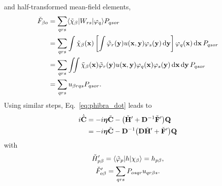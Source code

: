 \documentclass[aip,jcp,preprint,superscriptaddress,nofootinbib]{revtex4-1}
\begin{document}
and half-transformed mean-field elements,
\begin{align}
    \check{F}_{\beta o}
    &= \sum_{qrs}  \langle \tilde{\chi}_{\beta} \vert W_{rs} \vert \varphi_{q} \rangle P_{qsor} \nonumber\\
    &= \sum_{qrs}
    \int \tilde{\chi}_{\beta} (\mathbf{x}) \left[ 
    \int \tilde{\varphi}_{r}(\mathbf{y}) u(\mathbf{x}, \mathbf{y}) \varphi_{s}(\mathbf{y})  \dd{\mathbf{y}} 
    \right] \varphi_{q} (\mathbf{x}) \dd{\mathbf{x}}
    P_{qsor} \nonumber\\
    &= \sum_{qrs}
    \iint \tilde{\chi}_{\beta} (\mathbf{x}) \tilde{\varphi}_{r}(\mathbf{y}) u(\mathbf{x}, \mathbf{y}) \varphi_{q} (\mathbf{x}) \varphi_{s}(\mathbf{y}) \dd{\mathbf{x}} \dd{\mathbf{y}} 
    P_{qsor} \nonumber\\
    &= \sum_{qrs}  u_{\beta r q s} P_{qsor}.
\end{align}
Using similar steps, Eq.~\eqref{eq:phibra_dot} leads to
\begin{align} \label{eq:C_tilde_dot}
    i \dot{\tilde{\mathbf{C}}} 
    &= -i  \bm{\eta} \tilde{\mathbf{C}} - 
    \big( \check{\mathbf{H}}' + \mathbf{D}^{-1} \check{\mathbf{F}}' \big) \mathbf{Q} \nonumber\\
    &= -i  \bm{\eta} \tilde{\mathbf{C}} - 
    \mathbf{D}^{-1} \big( \mathbf{D} \check{\mathbf{H}}' + \check{\mathbf{F}}' \big) \mathbf{Q}
\end{align}
with
\begin{gather}
    \check{H}'_{p \beta} = \langle \tilde{\varphi}_{p} \vert h \vert \chi_{\beta} \rangle = h_{p \beta}, \\
    \check{F}'_{o \beta} = \sum_{qrs} P_{osqr} u_{qr\beta s}.
\end{gather}
\end{document}
